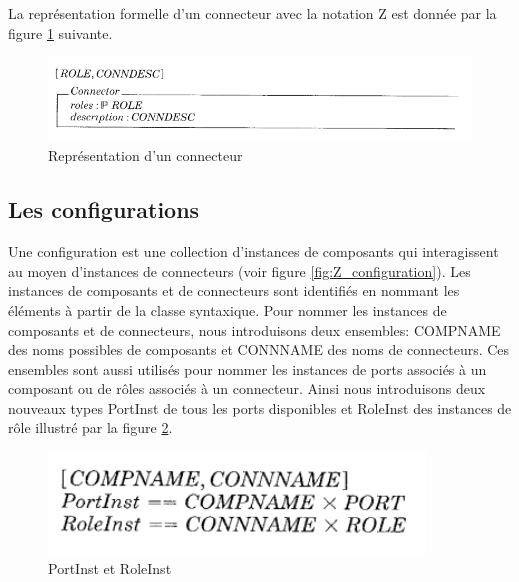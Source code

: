 La représentation formelle d'un connecteur avec la notation Z est donnée par la figure \ref{fig:Z_connector_schema} suivante.
\begin{figure}[h!]
  \includegraphics[scale=0.7]{images/Z_connector_schema.png}
  \caption{Représentation d'un connecteur}
  \label{fig:Z_connector_schema}
\end{figure}

\subsection{Les configurations}
Une configuration est une collection d'instances de composants qui interagissent au moyen d’instances de connecteurs (voir figure  \ref{fig:Z_configuration}). Les instances de composants et de connecteurs sont identifiés en nommant les éléments à partir de la classe syntaxique. Pour nommer les instances de composants et de connecteurs, nous introduisons deux ensembles: COMPNAME des noms possibles de composants et CONNNAME des noms de connecteurs. Ces ensembles sont aussi utilisés pour nommer les instances de ports associés à un composant ou de rôles associés à un connecteur.   Ainsi nous introduisons deux nouveaux types PortInst de tous les ports disponibles et RoleInst des instances de rôle illustré par la figure \ref{fig:Z_portInst_roleInst}.
\begin{figure}[h!]
\includegraphics[scale=0.7, width=100mm]{images/Z_portInst_roleInst.png}
  \caption{PortInst et RoleInst}
  \label{fig:Z_portInst_roleInst}
\end{figure}

